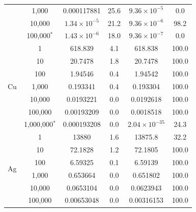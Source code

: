 \begin{table}[htbp]
\begin{tabular}{@{}lccccc@{}}
              & 1,000             & 0.000117881           & 25.6              & \(9.36\times10^{-5}\)  & 0.0               \\
              & 10,000            & \(1.34\times10^{-5}\) & 21.2              & \(9.36\times10^{-6}\)  & 98.2              \\
              & 100,000\(^{*}\)   & \(1.43\times10^{-6}\) & 18.0              & \(9.36\times10^{-7}\)  & 0.0               \\
        \midrule
        \multirow{7}{*}{Cu}
              & 1                 & 618.839               & 4.1               & 618.838                & 100.0             \\
              & 10                & 20.7478               & 1.8               & 20.7478                & 100.0             \\
              & 100               & 1.94546               & 0.4               & 1.94542                & 100.0             \\
              & 1,000             & 0.193341              & 0.4               & 0.193304               & 100.0             \\
              & 10,000            & 0.0193221             & 0.0               & 0.0192618              & 100.0             \\
              & 100,000           & 0.00193209            & 0.0               & 0.0018518              & 100.0             \\
              & 1,000,000\(^{*}\) & 0.000193208           & 0.0               & \(2.04\times10^{-35}\) & 24.3              \\
        \midrule
        \multirow{7}{*}{Ag}
              & 1                 & 13880                 & 1.6               & 13875.8                & 32.2              \\
              & 10                & 72.1828               & 1.2               & 72.1805                & 100.0             \\
              & 100               & 6.59325               & 0.1               & 6.59139                & 100.0             \\
              & 1,000             & 0.653664              & 0.0               & 0.651802               & 100.0             \\
              & 10,000            & 0.0653104             & 0.0               & 0.0623943              & 100.0             \\
              & 100,000           & 0.00653048            & 0.0               & 0.00316153             & 100.0             \\

\end{tabular}
\end{table}
